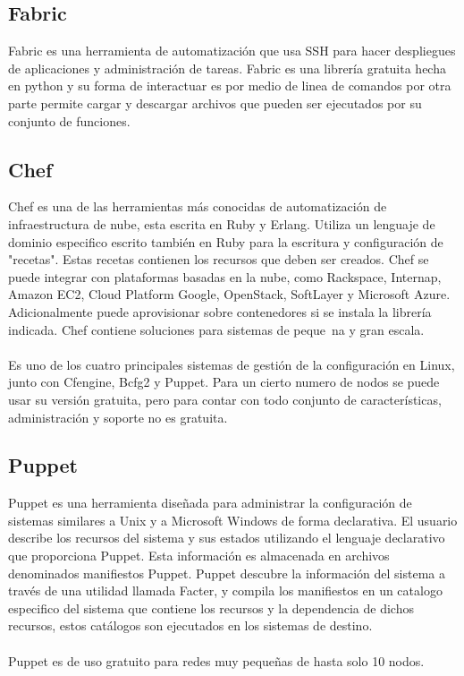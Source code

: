 \subsection{Fabric}
Fabric \cite{fabfile16} es una herramienta de automatización que usa SSH para hacer despliegues de aplicaciones y administración de tareas. Fabric es una librería gratuita hecha en python y su forma de interactuar es por medio de linea de comandos por otra parte permite cargar y descargar archivos que pueden ser ejecutados por su conjunto de funciones.

\subsection{Chef}
Chef es una de las herramientas más conocidas de automatización de infraestructura de nube, esta escrita en Ruby y Erlang. Utiliza un lenguaje de dominio especifico escrito también en Ruby para la escritura y configuración de "recetas". Estas recetas contienen los recursos que deben ser creados. Chef se puede integrar con plataformas basadas en la nube, como Rackspace, Internap, Amazon EC2, Cloud Platform Google, OpenStack, SoftLayer y Microsoft Azure. Adicionalmente puede aprovisionar sobre contenedores si se instala la librería indicada. Chef contiene soluciones para sistemas de peque~na y gran escala. \cite{Chef15}\\
\\
Es uno de los cuatro principales sistemas de gestión de la configuración en Linux, junto con Cfengine, Bcfg2 y Puppet. Para un cierto numero de nodos se puede usar su versión gratuita, pero para contar con todo conjunto de características, administración y soporte no es gratuita.

\subsection{Puppet}
Puppet es una herramienta diseñada para administrar la configuración de sistemas similares a Unix y a Microsoft Windows de forma declarativa. El usuario describe los recursos del sistema y sus estados utilizando el lenguaje declarativo que proporciona Puppet. Esta información es almacenada en archivos denominados manifiestos Puppet. Puppet descubre la información del sistema a través de una utilidad llamada Facter, y compila los manifiestos en un catalogo especifico del sistema que contiene los recursos y la dependencia de dichos recursos, estos catálogos son ejecutados en los sistemas de destino. \cite{Pupet15}\\
\\
Puppet es de uso gratuito para redes muy pequeñas de hasta solo 10 nodos.

